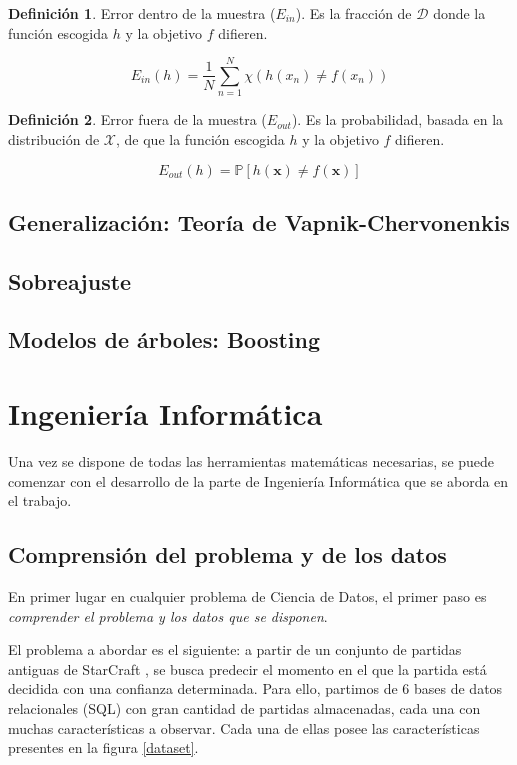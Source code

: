 \documentclass[a4paper,11pt]{book}\usepackage[]{graphicx}\usepackage[]{color}
\theoremstyle{plain}
\theoremstyle{definition}
\newtheorem{definicion}{Definición}[chapter]
\begin{document}
\begin{definicion}
  Error dentro de la muestra ($E_{in}$). Es la fracción de $\mathcal{D}$ donde la función escogida $h$ y la objetivo $f$ difieren.

  \[
    E_{in}(h) = \frac{1}{N} \sum\limits_{n=1}^N \chi(h(x_n) \neq f(x_n))
  \]
\end{definicion}

\begin{definicion}
  Error fuera de la muestra ($E_{out}$). Es la probabilidad, basada en la distribución
  de $\mathcal{X}$, de que la función escogida $h$ y la objetivo $f$ difieren.

  \[
    E_{out}(h) = \mathbb{P}[h(\textbf{x}) \neq f(\textbf{x})]
  \]
\end{definicion}


\subsection{Generalización: Teoría de Vapnik-Chervonenkis}

\subsection{Sobreajuste}

\subsection{Modelos de árboles: Boosting}

\newpage
\section{Ingeniería Informática}
Una vez se dispone de todas las herramientas matemáticas necesarias,
se puede comenzar con el desarrollo de la parte de Ingeniería Informática que
se aborda en el trabajo.

\subsection{Comprensión del problema y de los datos}

En primer lugar en cualquier problema de Ciencia de Datos, el primer
paso es \emph{comprender el problema y los datos que se disponen}.

El problema a abordar es el siguiente: a partir de un conjunto de
partidas antiguas de StarCraft \cite{dataset2014}, se busca predecir
el momento en el que la partida está decidida con una confianza
determinada. Para ello, partimos de 6 bases de datos relacionales
(SQL) con gran cantidad de partidas almacenadas, cada una con muchas
características a observar. Cada una de ellas posee las
características presentes en la figura \ref{dataset}.
\end{document}
